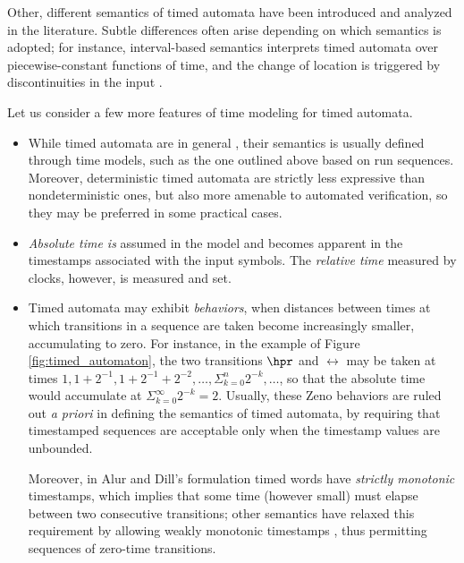 Other, different semantics of timed automata have been introduced 
and analyzed in the literature. Subtle differences often arise 
depending on which semantics is adopted; for instance, interval-based 
semantics interprets timed automata over piecewise-constant functions 
of time, and the change of location is triggered by discontinuities 
in the input \cite{AFH96,ACM02,Asa04}.

Let us consider a few more features of time modeling for timed 
automata. 
\begin{itemize}
\item While timed automata are in general , their 
semantics is usually defined through  time models, such 
as the one outlined above based on run sequences. Moreover, deterministic 
timed automata are strictly less expressive than nondeterministic 
ones, but also more amenable to automated verification, so they 
may be preferred in some practical cases.

\item \emph{Absolute time is}  assumed in the model 
and becomes apparent in the timestamps associated with the input 
symbols. The \emph{relative time} measured by clocks, however, is  
measured and set.

\item Timed automata may exhibit  \emph{behaviors}, when distances 
between times at which transitions in a sequence are taken become 
increasingly smaller, accumulating to zero. For instance, in 
the example of Figure \ref{fig:timed_automaton}, the two transitions $\hpr$ and $\rel$ 
may be taken at times $1, 1+2^{-1}, 1+2^{-1}+2^{-2}, \ldots, \Sigma_{k = 0}^{n} 2^{-k}, \ldots$, so that the absolute time would accumulate at $\Sigma_{k = 0}^{\infty} 2^{-k} = 2$. Usually, these Zeno behaviors are ruled out \emph{a priori} 
in defining the semantics of timed automata, by requiring that 
timestamped sequences are acceptable only when the timestamp 
values are unbounded.

Moreover, in Alur and Dill's formulation \cite{AD94} timed words have \emph{strictly monotonic} timestamps,
which implies that some time (however small) must elapse between two consecutive transitions; other semantics 
have relaxed this requirement by allowing weakly monotonic timestamps  \cite{BY04}, thus permitting sequences of zero-time transitions. 
\end{itemize}

